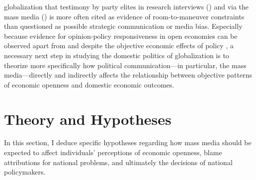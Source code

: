 \documentclass[12pt]{report}
\begin{document}
globalization that testimony by party elites in research interviews
(\citealt[206-07]{Hellwig:2012vk}) and via the mass media (\citealt[420-21]{Hellwig:2011iu}) is more
often cited as evidence of room-to-maneuver constraints than questioned as possible strategic
communication or media bias. Especially because evidence for opinion-policy responsiveness in open
economies can be observed apart from and despite the objective economic effects of policy
\citep{Sattler:2008vw}, a necessary next step in studying the domestic politics of globalization is
to theorize more specifically how political communication---in particular, the mass media---directly
and indirectly affects the relationship between objective patterns of economic openness and domestic
economic outcomes.

\section{Theory and Hypotheses}

In this section, I deduce specific hypotheses regarding how mass media should be expected to affect
individuals' perceptions of economic openness, blame attributions for national problems, and
ultimately the decisions of national policymakers.
\end{document}
